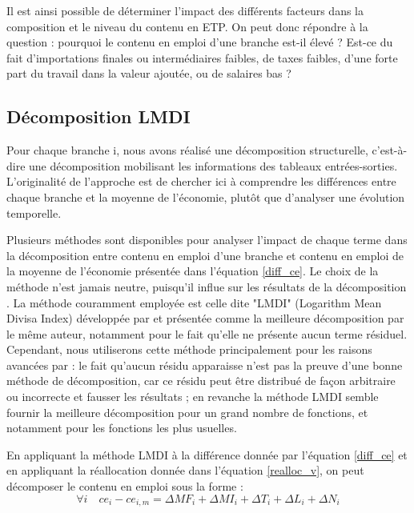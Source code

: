 Il est ainsi possible de déterminer l’impact des différents facteurs dans la composition et le niveau du contenu en ETP. On peut donc répondre à la question : pourquoi le contenu en emploi d’une branche est-il élevé ? Est-ce du fait d’importations finales ou intermédiaires faibles, de taxes faibles, d’une forte part du travail dans la valeur ajoutée, ou de salaires bas ?

\clearpage

\subsection{Décomposition LMDI} \label{app:decompo_LMDI}

Pour chaque branche i, nous avons réalisé une décomposition structurelle, c'est-à-dire une décomposition mobilisant les informations des tableaux entrées-sorties. L'originalité de l'approche est de chercher ici à comprendre les différences entre chaque branche et la moyenne de l'économie, plutôt que d'analyser une évolution temporelle. 

Plusieurs méthodes sont disponibles pour analyser l'impact de chaque terme dans la décomposition entre contenu en emploi d’une branche et contenu en emploi de la moyenne de l’économie présentée dans l'équation \ref{diff_ce}. Le choix de la méthode n'est jamais neutre, puisqu'il influe sur les résultats de la décomposition \citep{Hoekstra2003}. La méthode couramment employée est celle dite "LMDI" (Logarithm Mean Divisa Index) développée par \citet{Ang2004,Ang2005} et présentée comme la meilleure décomposition par le même auteur, notamment pour le fait qu’elle ne présente aucun terme résiduel. Cependant, nous utiliserons cette méthode principalement pour les raisons avancées par \citet{Muller} : le fait qu'aucun résidu apparaisse n'est pas la preuve d'une bonne méthode de décomposition, car ce résidu peut être distribué de façon arbitraire ou incorrecte et fausser les résultats ; en revanche la méthode LMDI semble fournir la meilleure décomposition pour un grand nombre de fonctions, et notamment pour les fonctions les plus usuelles.

En appliquant la méthode LMDI à la différence donnée par l'équation \ref{diff_ce} et en appliquant la réallocation donnée dans l'équation \ref{realloc_v}, on peut décomposer le contenu en emploi sous la forme : 
\begin{equation*}
\forall i \quad ce_i - ce_{i,m} = \Delta MF_i + \Delta MI_i + \Delta T_i +\Delta L_i + \Delta N_i
\end{equation*}

